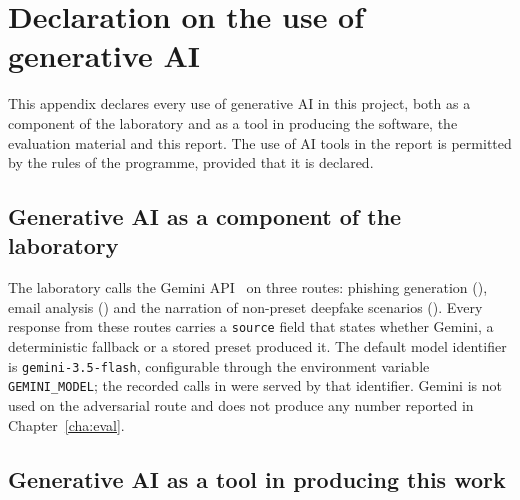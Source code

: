 \chapter{Declaration on the use of generative AI}
\label{app:ai}

This appendix declares every use of generative AI in this project, both as a component of the laboratory and as a tool in producing the software, the evaluation material and this report. The use of AI tools in the report is permitted by the rules of the programme, provided that it is declared.

\section{Generative AI as a component of the laboratory}
\label{sec:ai-component}

The laboratory calls the Gemini API~\cite{geminiapi} on three routes: phishing generation (), email analysis () and the narration of non-preset deepfake scenarios (). Every response from these routes carries a \texttt{source} field that states whether Gemini, a deterministic fallback or a stored preset produced it. The default model identifier is \texttt{gemini-3.5-flash}, configurable through the environment variable \texttt{GEMINI\_MODEL}; the recorded calls in  were served by that identifier. Gemini is not used on the adversarial route and does not produce any number reported in Chapter~\ref{cha:eval}.

\section{Generative AI as a tool in producing this work}
\label{sec:ai-tools}

